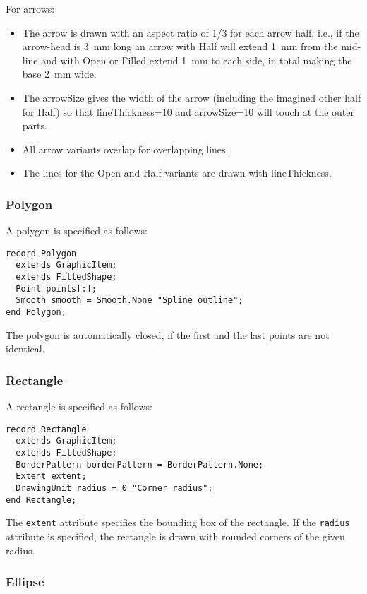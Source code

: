 For arrows:

\begin{itemize}
\item
  The arrow is drawn with an aspect ratio of 1/3 for each arrow half, i.e.,
if the arrow-head is 3~mm long an arrow with Half will extend 1~mm from the
mid-line and with Open or Filled extend 1~mm to each side, in total making the base 2~mm wide.
\item
  The arrowSize gives the width of the arrow (including the imagined
  other half for Half) so that lineThickness=10 and arrowSize=10 will
  touch at the outer parts.
\item
  All arrow variants overlap for overlapping lines.
\item
  The lines for the Open and Half variants are drawn with lineThickness.
\end{itemize}

\subsubsection{Polygon}

A polygon is specified as follows:

\begin{lstlisting}[language=modelica]
record Polygon
  extends GraphicItem;
  extends FilledShape;
  Point points[:];
  Smooth smooth = Smooth.None "Spline outline";
end Polygon;
\end{lstlisting}
The polygon is automatically closed, if the first and the last points
are not identical.

\subsubsection{Rectangle}

A rectangle is specified as follows:

\begin{lstlisting}[language=modelica]
record Rectangle
  extends GraphicItem;
  extends FilledShape;
  BorderPattern borderPattern = BorderPattern.None;
  Extent extent;
  DrawingUnit radius = 0 "Corner radius";
end Rectangle;
\end{lstlisting}
The \lstinline!extent! attribute specifies the bounding box of the rectangle. If the
\lstinline!radius! attribute is specified, the rectangle is drawn with rounded
corners of the given radius.

\subsubsection{Ellipse}

